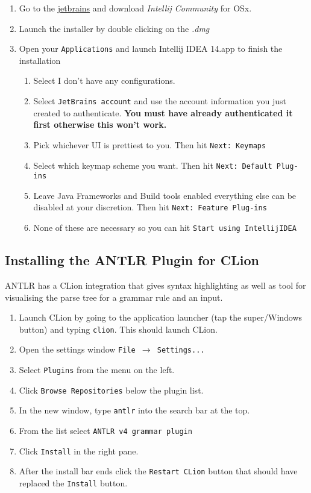 \documentclass[../setup.tex]{subfiles}
\begin{document}
		\begin{enumerate}
			\item Go to the \href{https://www.jetbrains.com/idea/download/index.html} {jetbrains} and download
			\textit{Intellij Community} for OSx.
			\item Launch the installer by double clicking on the \textit{.dmg}
			\item Open your \texttt{Applications} and launch Intellij IDEA 14.app to finish the installation
			\begin{enumerate}
				\item Select I don't have any configurations.
				\item Select \texttt{JetBrains account} and use the account information you just created to
				authenticate. \textbf{You must have already authenticated it first otherwise this won't work.}
				\item Pick whichever UI is prettiest to you. Then hit \texttt{Next: Keymaps}
				\item Select which keymap scheme you want. Then hit \texttt{Next: Default Plug-ins}
				\item Leave Java Frameworks and Build tools enabled everything else can be disabled at your discretion.
				Then hit \texttt{Next: Feature Plug-ins}
				\item None of these are necessary so you can hit \texttt{Start using IntellijIDEA}
			\end{enumerate}
		\end{enumerate}

\subsection{Installing the ANTLR Plugin for CLion}
ANTLR has a CLion integration that gives syntax highlighting as well as tool for visualising the
parse tree for a grammar rule and an input.
\begin{enumerate}
	\item
    Launch CLion by going to the application launcher (tap the super/Windows button) and typing
    \lstinline{clion}. This should launch CLion.
	\item
    Open the settings window \texttt{File $\rightarrow$ Settings...}
  \item
    Select \texttt{Plugins} from the menu on the left.
	\item
    Click \texttt{Browse Repositories} below the plugin list.
  \item
    In the new window, type \texttt{antlr} into the search bar at the top.
	\item
    From the list select \lstinline{ANTLR v4 grammar plugin}
  \item
    Click \texttt{Install} in the right pane.
	\item
    After the install bar ends click the \texttt{Restart CLion} button that should have replaced
    the \texttt{Install} button.
\end{enumerate}
\end{document}
